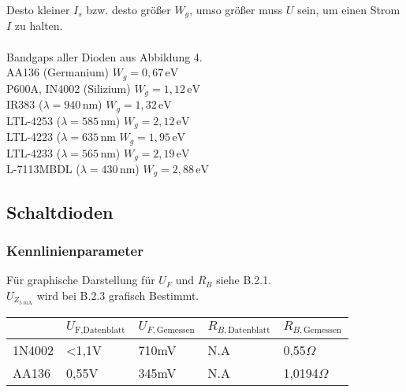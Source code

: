 \documentclass[
	a4paper, %
	12pt, %
]{CSUniSchoolLabReport}
\newcommand{\milli}{m}
\begin{document}
\vspace{1em} 

Desto kleiner $I_s$ bzw. desto größer $W_g$, umso größer muss $U$ sein, um einen Strom $I$ zu halten.\\ \\  
Bandgaps aller Dioden aus Abbildung 4.\\
AA136 (Germanium) \( W_g = 0{,}67\,\text{eV} \)\\
P600A, IN4002 (Silizium) \( W_g = 1{,}12\,\text{eV} \)\\
IR383 (\( \lambda = 940\,\text{nm} \)) \( W_g = 1{,}32\,\text{eV} \)\\
LTL-4253 (\( \lambda = 585\,\text{nm} \)) \( W_g = 2{,}12\,\text{eV} \)\\
LTL-4223 (\( \lambda = 635\,\text{nm} \) \( W_g = 1{,}95\,\text{eV} \)\\
LTL-4233 (\( \lambda = 565\,\text{nm} \)) \( W_g = 2{,}19\,\text{eV} \)\\
L-7113MBDL (\( \lambda = 430\,\text{nm} \)) \( W_g = 2{,}88\,\text{eV} \)
\subsection{Schaltdioden}
\subsubsection{Kennlinienparameter}
Für graphische Darstellung für $U_F$ und $R_B$ siehe B.2.1. \\
$U_{Z_{\SI{5}{\milli\ampere}}}$ wird bei B.2.3 grafisch Bestimmt. \\

\begin{table}[H]
\centering
\begin{tabular}{l|llll}
                            & $U_{\text{F,Datenblatt}}$ & $U_{F,\text{Gemessen}}$ & $R_{B,\text{Datenblatt}}$ & $R_{B,\text{Gemessen}}$ \\
\hline
1N4002                     & <1,1V                        & 710mV                      & N.A                          & 0,55$\Omega$                       \\
\hline
AA136                      & 0,55V                        & 345mV                      & N.A                          & 1,0194$\Omega$                       \\                       
\end{tabular}
\end{table}
\end{document}
